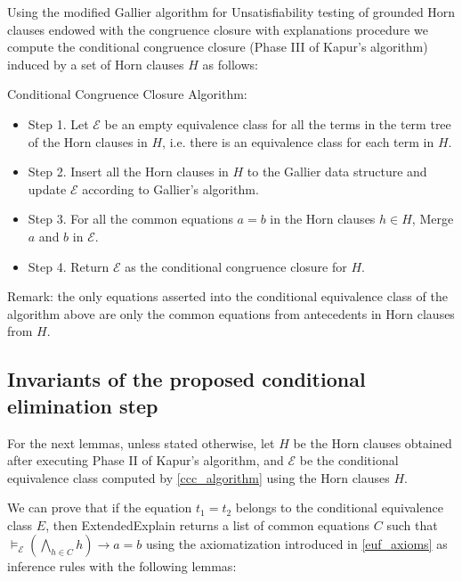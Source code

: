     


Using the modified Gallier algorithm for Unsatisfiability testing of
grounded Horn clauses endowed with the congruence
closure with explanations procedure we compute the conditional
congruence closure (Phase III of Kapur's algorithm) induced
by a set of Horn clauses $H$ as follows:

Conditional Congruence Closure Algorithm: \label{ccc_algorithm} \\
\begin{itemize} 
  \item[] Step 1. Let $\mathcal{E}$ be an empty equivalence class
    for all the terms in the term tree of the Horn clauses in $H$,
    i.e. there is an equivalence class for each term in $H$.

  \item[] Step 2. Insert all the Horn clauses in $H$ to the Gallier
    data structure and update $\mathcal{E}$ according to Gallier's
    algorithm.

  \item[] Step 3. For all the common equations $a = b$ 
    in the Horn clauses $h \in H$, Merge $a$ and $b$ in 
    $\mathcal{E}$.

  \item[] Step 4. Return $\mathcal{E}$ as the conditional
    congruence closure for $H$.
\end{itemize}

Remark: the only equations asserted into the 
conditional equivalence class of the algorithm
above are only the common equations from 
antecedents in Horn clauses from $H$.

\subsection{Invariants of the proposed
conditional elimination step}

For the next lemmas, unless stated otherwise, let
$H$ be the Horn clauses obtained
after executing Phase II of Kapur's algorithm, and
$\mathcal{E}$ be the conditional equivalence class
computed by \ref{ccc_algorithm} using the Horn clauses
$H$.

We can prove that if the equation $t_1 = t_2$ belongs
to the conditional equivalence class $E$, 
then ExtendedExplain returns
a list of common equations $C$ such that
$\models_{\mathcal{E}} (\bigwedge_{h \in C} h) \rightarrow a = b$
using the axiomatization introduced in \ref{euf_axioms} as 
inference rules with the following lemmas:

